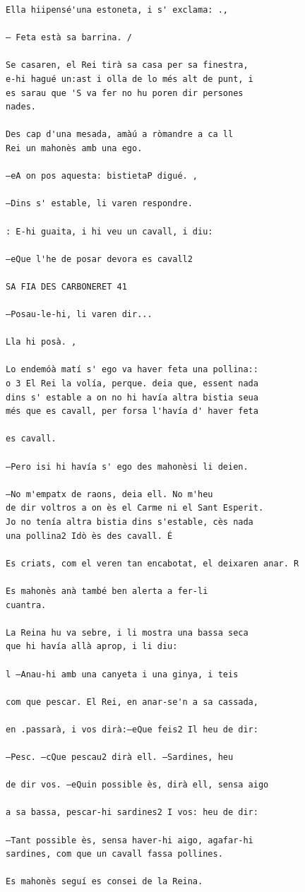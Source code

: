 \documentclass[
  letterpaper,
  DIV=11,
  numbers=noendperiod]{scrreprt}
\begin{document}
\begin{verbatim}
Ella hiipensé'una estoneta, i s' exclama: .,

— Feta està sa barrina. /

Se casaren, el Rei tirà sa casa per sa finestra,
e-hi hagué un:ast i olla de lo més alt de punt, i
es sarau que 'S va fer no hu poren dir persones
nades.

Des cap d'una mesada, amàú a ròmandre a ca ll
Rei un mahonès amb una ego.

—eA on pos aquesta: bistietaP digué. ,

—Dins s' estable, li varen respondre.

: E-hi guaita, i hi veu un cavall, i diu:

—eQue l'he de posar devora es cavall2

SA FIA DES CARBONERET 41

—Posau-le-hi, li varen dir...

Lla hi posà. ,

Lo endemóà matí s' ego va haver feta una pollina::
o 3 El Rei la volía, perque. deia que, essent nada
dins s' estable a on no hi havía altra bistia seua
més que es cavall, per forsa l'havía d' haver feta

es cavall.

—Pero isi hi havía s' ego des mahonèsi li deien.

—No m'empatx de raons, deia ell. No m'heu
de dir voltros a on ès el Carme ni el Sant Esperit.
Jo no tenía altra bistia dins s'estable, cès nada
una pollina2 Idò ès des cavall. É

Es criats, com el veren tan encabotat, el deixaren anar. R

Es mahonès anà també ben alerta a fer-li
cuantra.

La Reina hu va sebre, i li mostra una bassa seca
que hi havía allà aprop, i li diu:

l —Anau-hi amb una canyeta i una ginya, i teis

com que pescar. El Rei, en anar-se'n a sa cassada,

en .passarà, i vos dirà:—eQue feis2 Il heu de dir:

—Pesc. —cQue pescau2 dirà ell. —Sardines, heu

de dir vos. —eQuin possible ès, dirà ell, sensa aigo

a sa bassa, pescar-hi sardines2 I vos: heu de dir:

—Tant possible ès, sensa haver-hi aigo, agafar-hi
sardines, com que un cavall fassa pollines.

Es mahonès seguí es consei de la Reina.


\end{verbatim}
\end{document}
